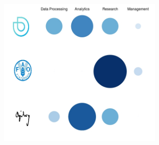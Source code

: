 \documentclass{tccv}
\begin{document}
\begin{figure}[h!]%
  \centering
  \includegraphics[width=9cm,height=7.5cm]{experience_association.jpeg}
\end{figure}
\end{document}
